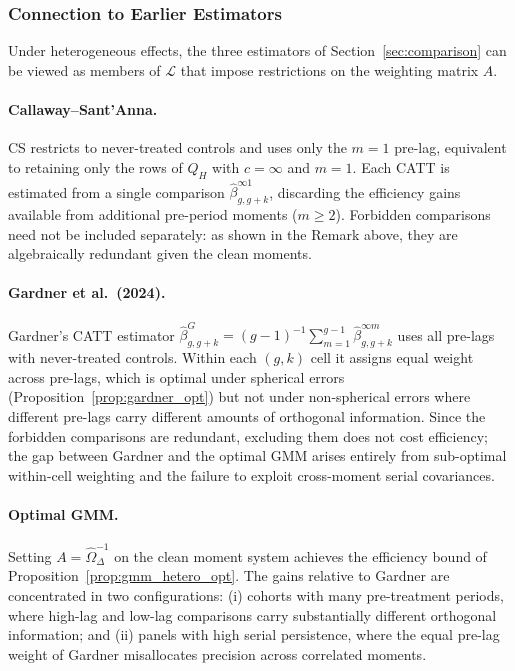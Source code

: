 \documentclass[12pt,letterpaper]{article}
\theoremstyle{remark}
\theoremstyle{definition}
\newcommand{\hbeta}{\hat{\beta}}
\begin{document}
\subsubsection{Connection to Earlier Estimators}
\label{sec:gmm_connection}

Under heterogeneous effects, the three estimators of
Section~\ref{sec:comparison} can be viewed as members of $\mathcal{L}$ that
impose restrictions on the weighting matrix $A$.

\paragraph{Callaway--Sant'Anna.}
CS restricts to never-treated controls and uses only the $m=1$ pre-lag,
equivalent to retaining only the rows of $Q_H$ with $c=\infty$ and $m=1$.
Each CATT is estimated from a single comparison $\hbeta^{\infty1}_{g,g+k}$,
discarding the efficiency gains available from additional pre-period moments
($m\geq2$). Forbidden comparisons need not be included separately: as shown
in the Remark above, they are algebraically redundant given the clean moments.

\paragraph{Gardner et al.\ (2024).}
Gardner's CATT estimator $\hbeta^G_{g,g+k}=(g-1)^{-1}\sum_{m=1}^{g-1}
\hbeta^{\infty m}_{g,g+k}$ uses all pre-lags with never-treated controls.
Within each $(g,k)$ cell it assigns equal weight across pre-lags, which is
optimal under spherical errors (Proposition~\ref{prop:gardner_opt}) but
not under non-spherical errors where different pre-lags carry different
amounts of orthogonal information. Since the forbidden comparisons are
redundant, excluding them does not cost efficiency; the gap between Gardner
and the optimal GMM arises entirely from sub-optimal within-cell weighting
and the failure to exploit cross-moment serial covariances.

\paragraph{Optimal GMM.}
Setting $A=\hat{\Omega}_\Delta^{-1}$ on the clean moment system achieves
the efficiency bound of Proposition~\ref{prop:gmm_hetero_opt}. The gains
relative to Gardner are concentrated in two configurations: (i) cohorts
with many pre-treatment periods, where high-lag and low-lag comparisons
carry substantially different orthogonal information; and (ii) panels with
high serial persistence, where the equal pre-lag weight of Gardner
misallocates precision across correlated moments.
\end{document}
